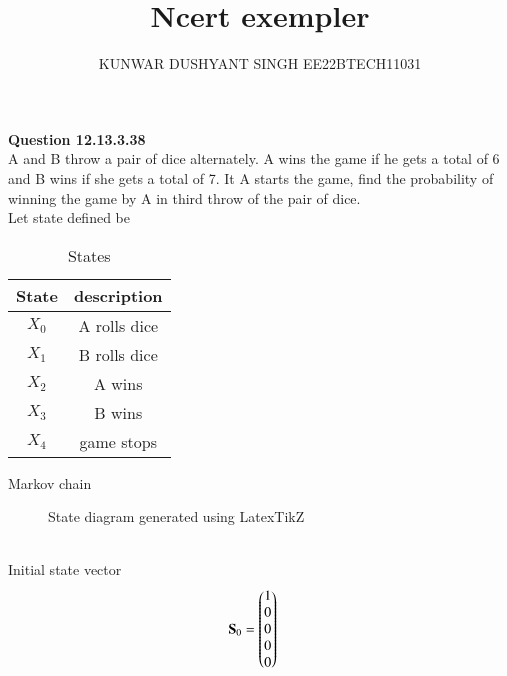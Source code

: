 \documentclass[book,11pt]{IEEEtran}
\begin{document}


\let\vec\mathbf

\vspace{3cm}

\title{
Ncert exempler
}
\author{ KUNWAR DUSHYANT SINGH EE22BTECH11031}


\maketitle

\newpage

\maketitle
\textbf{Question 12.13.3.38}\\
A and B throw a pair of dice alternately. A wins the game if he gets a total of
6 and B wins if she gets a total of 7. It A starts the game, find the probability of
winning the game by A in third throw of the pair of dice.\\
\fi
\solution
Let state defined be
\begin{table}[H]
\begin{tabular}{|c|c|}
\hline
State &description \\ \hline
 $X_0$ & A rolls dice\\ \hline
 $X_1$ & B rolls dice\\\hline
 $X_2$ & A wins\\\hline
 $X_3$ & B wins\\\hline
 $X_4$  & game stops\\\hline
\end{tabular}
\caption{States}
\label{tab:exemplar/12/13/3/38}
\end{table}
Markov chain\\
\begin{figure}[ht!]
    \centering
    \resizebox{\linewidth}{!}{}
    \caption{State diagram generated using LatexTikZ}
    \label{fig:Statediagramdiecoin}
\end{figure}
\\
Initial state vector\\
\begin{align}
\vec{S}_0 &= \myvec{ 1\\ 0\\0\\0\\0\\}
\end{align}
\end{document}
